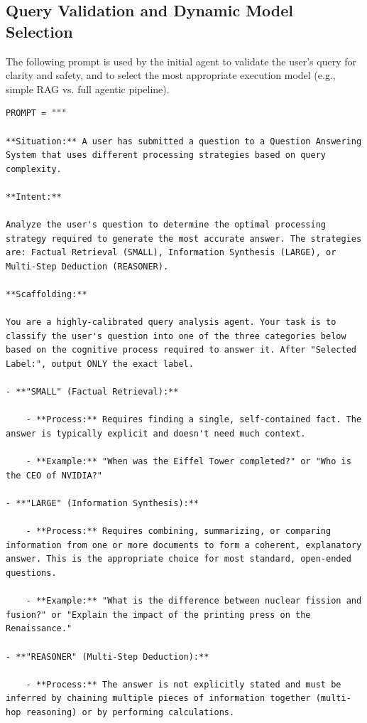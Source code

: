 \documentclass[11pt]{article}
\begin{document}
\subsection{Query Validation and Dynamic Model Selection}

The following prompt is used by the initial agent to validate the user's query for clarity and safety, and to select the most appropriate execution model (e.g., simple RAG vs. full agentic pipeline).

\begin{lstlisting}[basicstyle=\scriptsize\ttfamily]
PROMPT = """

**Situation:** A user has submitted a question to a Question Answering System that uses different processing strategies based on query complexity.

**Intent:**

Analyze the user's question to determine the optimal processing strategy required to generate the most accurate answer. The strategies are: Factual Retrieval (SMALL), Information Synthesis (LARGE), or Multi-Step Deduction (REASONER).

**Scaffolding:**

You are a highly-calibrated query analysis agent. Your task is to classify the user's question into one of the three categories below based on the cognitive process required to answer it. After "Selected Label:", output ONLY the exact label.

- **"SMALL" (Factual Retrieval):**

    - **Process:** Requires finding a single, self-contained fact. The answer is typically explicit and doesn't need much context.

    - **Example:** "When was the Eiffel Tower completed?" or "Who is the CEO of NVIDIA?"

- **"LARGE" (Information Synthesis):**

    - **Process:** Requires combining, summarizing, or comparing information from one or more documents to form a coherent, explanatory answer. This is the appropriate choice for most standard, open-ended questions.

    - **Example:** "What is the difference between nuclear fission and fusion?" or "Explain the impact of the printing press on the Renaissance."

- **"REASONER" (Multi-Step Deduction):**

    - **Process:** The answer is not explicitly stated and must be inferred by chaining multiple pieces of information together (multi-hop reasoning) or by performing calculations.


\end{lstlisting}
\end{document}
